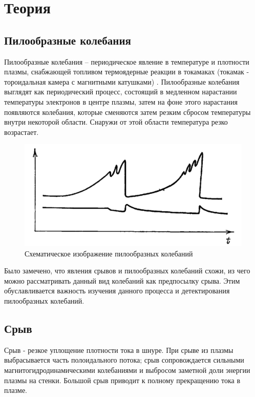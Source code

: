 \documentclass[12pt,a4paper]{article}
\begin{document}
	\section{Теория}
		\subsection{Пилообразные колебания}
			Пилообразные колебания – периодическое явление в температуре и плотности плазмы, снабжающей топливом термоядерные реакции в токамаках (токамак - тороидальная камера с магнитными катушками) \cite{naked_science}. Пилообразные колебания выглядят как периодический процесс, состоящий в медленном нарастании температуры электронов в центре плазмы, затем на фоне этого нарастания появляются колебания, которые сменяются затем резким сбросом температуры внутри некоторой области. Снаружи от этой области температура резко возрастает. \cite{Kadomcev}
			\FloatBarrier
			\begin{figure}[h!]
				\centering\includegraphics[width=1\linewidth]{./../plots/sawtooth_example.png}
				\caption{Схематическое изображение пилообразных колебаний}
			\end{figure}
			\FloatBarrier
			Было замечено, что явления срывов и пилообразных колебаний схожи, из чего можно рассматривать данный вид колебаний как предпосылку срыва. Этим обуславливается важность изучения данного процесса и детектирования пилообразных колебаний.	
		\subsection{Срыв}
		 Срыв - резкое уплощение плотности тока в шнуре. При срыве из плазмы выбрасывается часть полоидального потока; срыв сопровождается сильными магнитогидродинамическими колебаниями и выбросом заметной доли энергии плазмы на стенки. Большой срыв приводит к полному прекращению тока в плазме. \cite{Kadomcev}
		 
\end{document}
